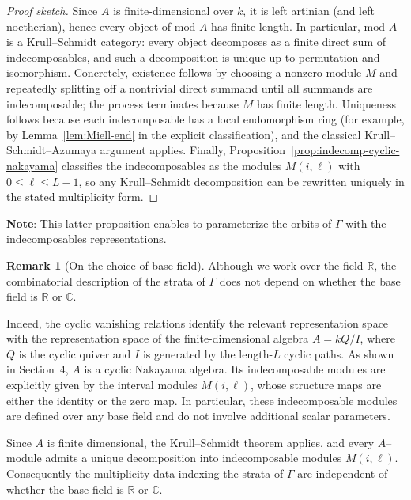 \documentclass{article}
\theoremstyle{definition}
\newtheorem{remark}[theorem]{Remark}
\begin{document}
\begin{proof}[Proof sketch]
Since $A$ is finite-dimensional over $k$, it is left artinian (and left noetherian), hence every object of $\mathrm{mod}\text{-}A$ has finite length.
In particular, $\mathrm{mod}\text{-}A$ is a Krull--Schmidt category: every object decomposes as a finite direct sum of indecomposables, and such a decomposition is unique up to permutation and isomorphism.
\noindent
Concretely, existence follows by choosing a nonzero module $M$ and repeatedly splitting off a nontrivial direct summand until all summands are indecomposable; the process terminates because $M$ has finite length.
Uniqueness follows because each indecomposable has a local endomorphism ring (for example, by Lemma~\ref{lem:Miell-end} in the explicit classification), and the classical Krull--Schmidt--Azumaya argument applies.
\noindent
Finally, Proposition~\ref{prop:indecomp-cyclic-nakayama} classifies the indecomposables as the modules $M(i,\ell)$ with $0\le \ell\le L-1$, so any Krull--Schmidt decomposition can be rewritten uniquely in the stated multiplicity form.
\end{proof}
\noindent
\textbf{Note}: This latter proposition enables to parameterize the orbits of $\Gamma$ with the indecomposables representations.
\begin{remark}[On the choice of base field]
Although we work over the field $\mathbb{R}$, the combinatorial
description of the strata of $\Gamma$ does not depend on whether the
base field is $\mathbb{R}$ or $\mathbb{C}$.

Indeed, the cyclic vanishing relations identify the relevant
representation space with the representation space of the
finite-dimensional algebra $A = kQ/I$, where $Q$ is the cyclic quiver
and $I$ is generated by the length-$L$ cyclic paths. As shown in
Section~4, $A$ is a cyclic Nakayama algebra. Its indecomposable modules
are explicitly given by the interval modules $M(i,\ell)$, whose
structure maps are either the identity or the zero map. In particular,
these indecomposable modules are defined over any base field and do not
involve additional scalar parameters.

Since $A$ is finite dimensional, the Krull--Schmidt theorem applies,
and every $A$--module admits a unique decomposition into indecomposable
modules $M(i,\ell)$. Consequently the multiplicity data indexing the
strata of $\Gamma$ are independent of whether the base field is
$\mathbb{R}$ or $\mathbb{C}$. 
\end{remark}
\end{document}
